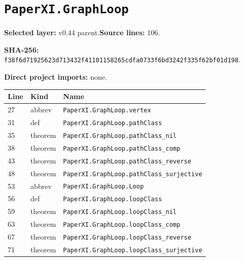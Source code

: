 \documentclass[10pt,oneside]{book}
\begin{document}
\section{\texorpdfstring{\nolinkurl{PaperXI.GraphLoop}}{PaperXI.GraphLoop}}\label{module:PaperXI.GraphLoop}

\textbf{Selected layer:} v0.44 parent.\quad\textbf{Source lines:} 106.\par\textbf{SHA-256:} {\scriptsize\nolinkurl{f38f6d71925623d713432f41101158265cdfa0733f6bd3242f335f62bf01d198}}.


\textbf{Direct project imports:} none.

\begin{longtable}{@{}p{}p{}p{}@{}}\toprule Line&Kind&Name\\\midrule\endhead

27&abbrev&\nolinkurl{PaperXI.GraphLoop.vertex}\\

31&def&\nolinkurl{PaperXI.GraphLoop.pathClass}\\

35&theorem&\nolinkurl{PaperXI.GraphLoop.pathClass_nil}\\

38&theorem&\nolinkurl{PaperXI.GraphLoop.pathClass_comp}\\

43&theorem&\nolinkurl{PaperXI.GraphLoop.pathClass_reverse}\\

48&theorem&\nolinkurl{PaperXI.GraphLoop.pathClass_surjective}\\

53&abbrev&\nolinkurl{PaperXI.GraphLoop.Loop}\\

56&def&\nolinkurl{PaperXI.GraphLoop.loopClass}\\

59&theorem&\nolinkurl{PaperXI.GraphLoop.loopClass_nil}\\

63&theorem&\nolinkurl{PaperXI.GraphLoop.loopClass_comp}\\

67&theorem&\nolinkurl{PaperXI.GraphLoop.loopClass_reverse}\\

71&theorem&\nolinkurl{PaperXI.GraphLoop.loopClass_surjective}\\


\end{longtable}
\end{document}
